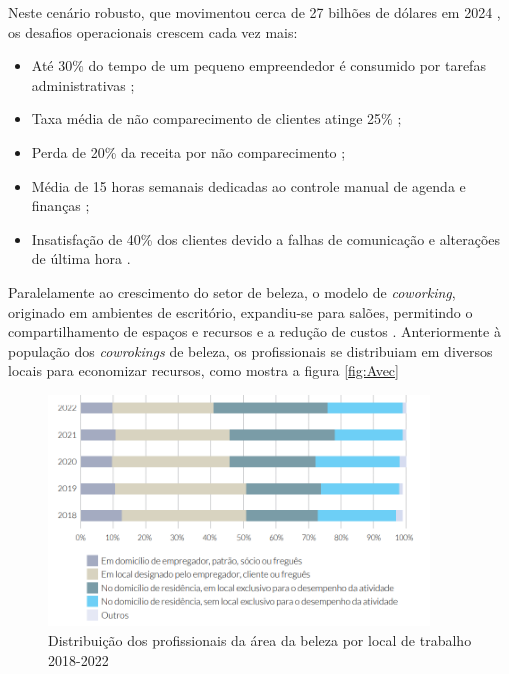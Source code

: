 Neste cenário robusto, que movimentou cerca de 27 bilhões de dólares em 2024 \cite{ecommercenapratica2025}, os desafios operacionais crescem cada vez mais: 

\begin{itemize}
	\item Até 30\% do tempo de um pequeno empreendedor é consumido por tarefas administrativas \cite{senac2022};
	\item Taxa média de não comparecimento de clientes atinge 25\% \cite{booksy2022};
	\item Perda de 20\% da receita por não comparecimento \cite{abihpec2021};
	\item Média de 15 horas semanais dedicadas ao controle manual de agenda e finanças \cite{fgv2020};
	\item Insatisfação de 40\% dos clientes devido a falhas de comunicação e alterações de última hora \cite{mindminers2022}.
\end{itemize}

Paralelamente ao crescimento do setor de beleza, o modelo de \emph{coworking}, originado em ambientes de escritório, expandiu-se para salões, permitindo o compartilhamento de espaços e recursos e a redução de custos \cite{sebrae_coworking,sebraesc2025}. Anteriormente à população dos \emph{cowrokings} de beleza, os profissionais se distribuiam em diversos locais para economizar recursos, como mostra a figura \ref{fig:Avec}

\begin{figure}[htb]
	\centering
	\includegraphics[width=0.9\textwidth]{cap01-Introducao/Images/1.3_local_trabalho_profissionais}
	\caption{Distribuição dos profissionais da área da beleza por local de trabalho 2018-2022}
	\label{fig:Distribuição_locais}
\end{figure}

